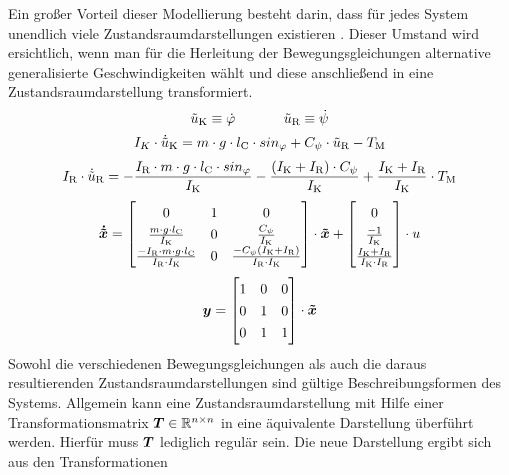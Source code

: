 Ein großer Vorteil dieser Modellierung besteht darin, dass für jedes System unendlich viele Zustandsraumdarstellungen existieren \cite[S. 54]{Beucher}. Dieser Umstand wird ersichtlich, wenn man für die Herleitung der Bewegungsgleichungen alternative generalisierte Geschwindigkeiten wählt und diese anschließend in eine Zustandsraumdarstellung transformiert.
\begin{equation}
\tilde{u}_{\text{K}} \equiv \dot{\varphi} \hspace{35pt} \tilde{u}_{\text{R}} \equiv \dot{\psi}
\end{equation}
\begin{equation}
I_K\cdot \dot{\tilde{u}}_{\text{K}} = m\cdot g \cdot l_{\text{C}} \cdot sin_{\varphi} + C_{\psi}\cdot \tilde{u}_{\text{R}} - T_{\text{M}}
\end{equation}
\begin{equation}
I_{\text{R}}\cdot \dot{\tilde{u}}_{\text{R}} = -\frac{I_{\text{R}}\cdot m\cdot g\cdot l_{\text{C}}\cdot sin_{\varphi}}{I_{\text{K}}} - \frac{(I_{\text{K}} + I_{\text{R}})\cdot C_{\psi}}{I_{\text{K}}} + \frac{I_{\text{K}} + I_{\text{R}}}{I_{\text{K}}}\cdot T_{\text{M}}
\end{equation}
\begin{equation}
\renewcommand*{\arraystretch}{1.3}
\bs{\dot{\tilde{x}}} = \begin{bmatrix}
0 & 1 & 0 
\\
\frac{m\cdot g\cdot l\idx{C}}{I\idx{K}} & 0 & \frac{C_{\psi}}{I\idx{K}}
\\
\frac{-I\idx{R}\cdot m\cdot g\cdot l\idx{C}}{I\idx{R}\cdot I\idx{K}} & 0 & \frac{-C_{\psi}(I\idx{K}+I\idx{R})}{I\idx{R}\cdot I\idx{K}} 
\end{bmatrix}\cdot \bs{\tilde{x}}
+
\begin{bmatrix}
0 \\ \frac{-1}{I\idx{K}} \\ \frac{I\idx{K}+I\idx{R}}{I\idx{K}\cdot I\idx{R}}
\end{bmatrix} \cdot u
\end{equation}
\begin{equation}
\bs{y} = \begin{bmatrix}
1 & 0 & 0 \\
0 & 1 & 0 \\
0 & 1 & 1 \\
\end{bmatrix} \cdot \bs{\tilde{x}}
\end{equation}
Sowohl die verschiedenen Bewegungsgleichungen als auch die daraus resultierenden Zustandsraumdarstellungen sind gültige Beschreibungsformen des Systems. Allgemein kann eine Zustandsraumdarstellung mit Hilfe einer Transformationsmatrix $\boldsymbol{T} \in \mathbb{R}^{n\times n}$ in eine äquivalente Darstellung überführt werden. Hierfür muss $\boldsymbol{T}$ lediglich regulär sein. Die neue Darstellung ergibt sich aus den Transformationen
